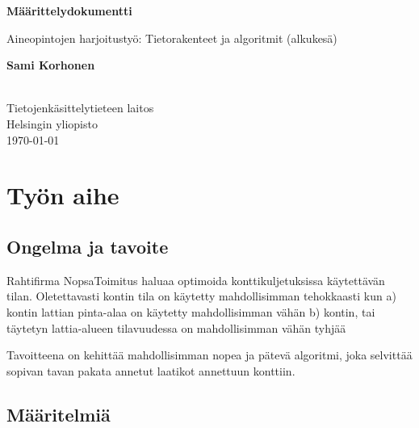 \documentclass[a4paper,12pt, titlepage]{article}
\begin{document}
\begin{titlepage}
    \begin{center}
        \vspace*{1cm}
        
        \LARGE
        \textbf{Määrittelydokumentti}
        
        \vspace{0.5cm}
        \Large
        Aineopintojen harjoitustyö: Tietorakenteet ja algoritmit (alkukesä)
        
        \vspace{1.5cm}
        
        \large
        \textbf{Sami Korhonen} \\
         \\
        
		\vfill        
        \normalsize
        Tietojenkäsittelytieteen laitos\\
        Helsingin yliopisto\\
		\large        
        \today
        
    \end{center}
\end{titlepage}



\section*{Työn aihe}
\subsection*{Ongelma ja tavoite}
Rahtifirma NopsaToimitus haluaa optimoida konttikuljetuksissa käytettävän tilan. Oletettavasti kontin tila on käytetty mahdollisimman tehokkaasti kun \newline
a) kontin lattian pinta-alaa on käytetty mahdollisimman vähän \newline
b) kontin, tai täytetyn lattia-alueen tilavuudessa on mahdollisimman vähän tyhjää\newline

\noindent
Tavoitteena on kehittää mahdollisimman nopea ja pätevä algoritmi, joka selvittää sopivan tavan pakata annetut laatikot annettuun konttiin.

\subsection*{Määritelmiä}
\end{document}

